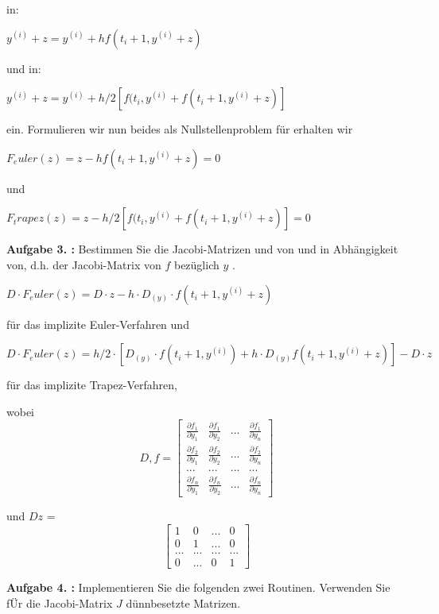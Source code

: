 in:

$ y^(i) + z = y^(i) + hf(t_i+1,y^(i) + z) $

und in:

$ y^(i) + z = y^(i) + h/2 [f(t_i, y^(i) + f(t_i+1,y^(i) + z)] $

ein. Formulieren wir nun beides als Nullstellenproblem für  erhalten wir

$ F_euler(z) = z - hf(t_i+1, y^(i) + z) = 0 $

und 

$F_trapez(z) =  z - h/2 [f(t_i, y^(i) + f(t_i+1,y^(i) + z)] = 0$
\begin{mybox}
\textbf{Aufgabe 3. :}
Bestimmen Sie die Jacobi-Matrizen  und  von  und  in Abhängigkeit von, d.h. der Jacobi-Matrix von $f$ bezüglich $y$ .
\end{mybox}


$ D\cdot F_euler(z) = D\cdot z - h\cdot D_(y)\cdot f(t_i+1, y^(i) + z) $

für das implizite Euler-Verfahren und

$ D\cdot F_euler(z) = h/2\cdot [D_(y)\cdot f(t_i+1, y^(i)) +  h\cdot D_(y)f(t_i+1, y^(i) + z)] - D\cdot z $

für das implizite Trapez-Verfahren,

wobei 
\begin{equation}
	D, f =
\begin{bmatrix}
	\frac{\partial f_1 }{\partial y_1} & \frac{\partial f_1 }{\partial y_2} & ... & \frac{\partial f_1 }{\partial y_n} \\
	\frac{\partial f_2 }{\partial y_1} & \frac{\partial f_2 }{\partial y_2} & ... & \frac{\partial f_2 }{\partial y_n} \\
	... & ... & ... & ... \\
	\frac{\partial f_n }{\partial y_1} & \frac{\partial f_n }{\partial y_2} & ... & \frac{\partial f_n }{\partial y_n} 
\end{bmatrix} 
\end{equation}


und $Dz$ =
\begin{equation}
\begin{bmatrix}
	1 & 0 & ... & 0 \\
	0 & 1 & ... & 0 \\
	... & ... & ... & ... \\
	0 & ... & 0 & 1 
\end{bmatrix}  
\end{equation}

\begin{mybox}
	\textbf{Aufgabe 4. :}
	Implementieren Sie die folgenden zwei Routinen. Verwenden Sie fÜr die Jacobi-Matrix $J$ dünnbesetzte
	Matrizen.
\end{mybox}

